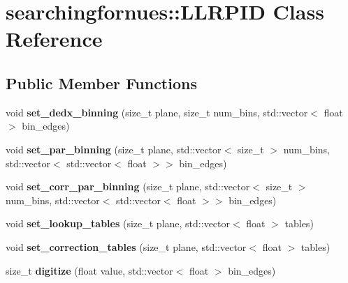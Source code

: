 \hypertarget{classsearchingfornues_1_1LLRPID}{}\section{searchingfornues\+:\+:L\+L\+R\+P\+ID Class Reference}
\label{classsearchingfornues_1_1LLRPID}
\subsection*{Public Member Functions}
\begin{DoxyCompactItemize}
\item 
void {\bfseries set\+\_\+dedx\+\_\+binning} (size\+\_\+t plane, size\+\_\+t num\+\_\+bins, std\+::vector$<$ float $>$ bin\+\_\+edges)\hypertarget{classsearchingfornues_1_1LLRPID_aa8fb15d37ae277de14b449ee3d734b4b}{}\label{classsearchingfornues_1_1LLRPID_aa8fb15d37ae277de14b449ee3d734b4b}

\item 
void {\bfseries set\+\_\+par\+\_\+binning} (size\+\_\+t plane, std\+::vector$<$ size\+\_\+t $>$ num\+\_\+bins, std\+::vector$<$ std\+::vector$<$ float $>$$>$ bin\+\_\+edges)\hypertarget{classsearchingfornues_1_1LLRPID_a9823701e9059de54a55cf8d180a3c42d}{}\label{classsearchingfornues_1_1LLRPID_a9823701e9059de54a55cf8d180a3c42d}

\item 
void {\bfseries set\+\_\+corr\+\_\+par\+\_\+binning} (size\+\_\+t plane, std\+::vector$<$ size\+\_\+t $>$ num\+\_\+bins, std\+::vector$<$ std\+::vector$<$ float $>$$>$ bin\+\_\+edges)\hypertarget{classsearchingfornues_1_1LLRPID_a4856a3584ef3a640e976398b00c4eb86}{}\label{classsearchingfornues_1_1LLRPID_a4856a3584ef3a640e976398b00c4eb86}

\item 
void {\bfseries set\+\_\+lookup\+\_\+tables} (size\+\_\+t plane, std\+::vector$<$ float $>$ tables)\hypertarget{classsearchingfornues_1_1LLRPID_a8596d9156bc1771641c3245e9cd71a94}{}\label{classsearchingfornues_1_1LLRPID_a8596d9156bc1771641c3245e9cd71a94}

\item 
void {\bfseries set\+\_\+correction\+\_\+tables} (size\+\_\+t plane, std\+::vector$<$ float $>$ tables)\hypertarget{classsearchingfornues_1_1LLRPID_a6abcb27f30a4e5086ecc60a0e944d9a0}{}\label{classsearchingfornues_1_1LLRPID_a6abcb27f30a4e5086ecc60a0e944d9a0}

\item 
size\+\_\+t {\bfseries digitize} (float value, std\+::vector$<$ float $>$ bin\+\_\+edges)\hypertarget{classsearchingfornues_1_1LLRPID_af605394ef38223a1600904c181828486}{}\label{classsearchingfornues_1_1LLRPID_af605394ef38223a1600904c181828486}


\end{DoxyCompactItemize}
